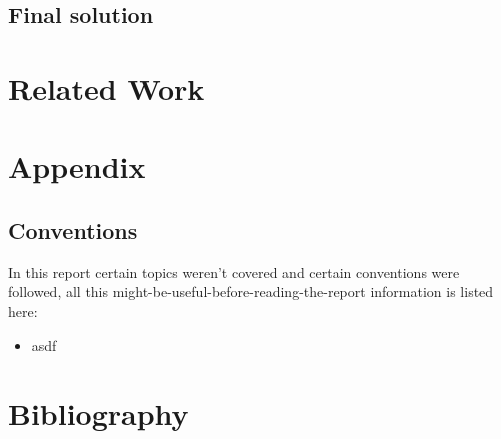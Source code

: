 \documentclass{report}
\begin{document}
\section{Final solution}
\label{sec:key_hierarchies}

\vspace{0.5cm}
\chapter{Related Work}
\label{sec:related work}

\vspace{0.5cm}
\chapter{Appendix}
\label{sec:appendix}

\section{Conventions}
\label{sec:conventions}

In this report certain topics weren't covered and certain conventions were followed, all this might-be-useful-before-reading-the-report information is listed here:
\begin{itemize}
	\item asdf
\end{itemize}

\vspace{0.5cm}
\chapter{Bibliography}
\label{sec:bibliography}

\printbibliography[heading=none]

\end{document}
